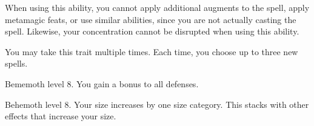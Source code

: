     When using this ability, you cannot apply additional augments to the spell, apply metamagic feats, or use similar abilities, since you are not actually casting the spell.
    Likewise, your concentration cannot be disrupted when using this ability.

     You may take this trait multiple times.
    Each time, you choose up to three new spells.

    \featpre Bememoth level 8.
    \featben You gain a  bonus to all defenses.

    \featpre Behemoth level 8.
    \featben Your size increases by one size category.
    This stacks with other effects that increase your size.

